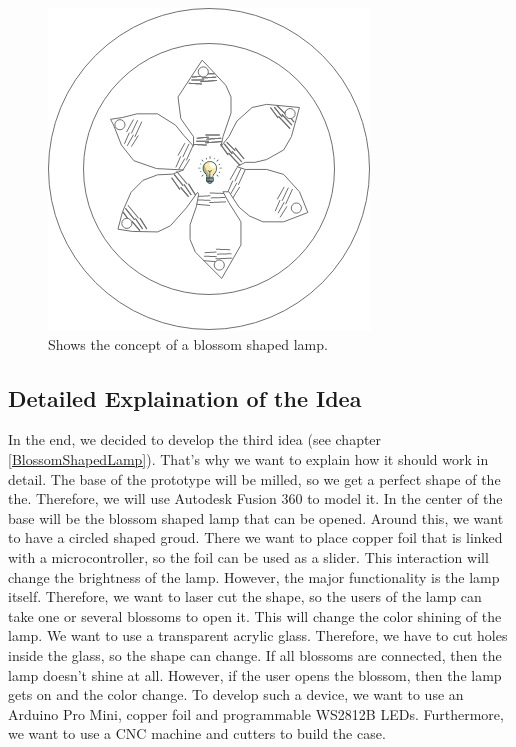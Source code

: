 \documentclass[doc.tex]{subfiles}
\begin{document}
    \begin{figure}[h!]
        \centering
        \includegraphics[scale=0.4]{images/projectideas/blossomLamp.png}
        \caption{Shows the concept of a blossom shaped lamp.}
        \label{fig:blossomLamp}
    \end{figure}

    \subsection{Detailed Explaination of the Idea}
        \begin{flushleft}
            In the end, we decided to develop the third idea (see chapter \ref{BlossomShapedLamp}). That's why we want to explain 
            how it should work in detail. \newline
            The base of the prototype will be milled, so we get a perfect shape of the the. Therefore, we will use Autodesk Fusion 360\cite{autodeskFusion360}
            to model it. In the center of the base will be the blossom shaped lamp that can be opened. Around this, we want to have a 
            circled shaped groud. There we want to place copper foil that is linked with a microcontroller, %
            so the foil can be used as a slider. This interaction will change the brightness of the lamp. \newline
            However, the major functionality is the lamp itself. Therefore, we want to laser cut the shape, so the users of the lamp can
            take one or several blossoms to open it. This will change the color shining of the lamp. We want to use a transparent acrylic glass.
            Therefore, we have to cut holes inside the glass, so the shape can change.  \newline
            If all blossoms are connected, then the lamp doesn't shine at all. However, if the user opens the blossom, then the lamp gets on
            and the color change. 
            \newline
            \newline
            To develop such a device, we want to use an Arduino Pro Mini, copper foil and programmable WS2812B LEDs.
            Furthermore, we want to use a CNC machine and cutters to build the case.
        \end{flushleft}
\end{document}
